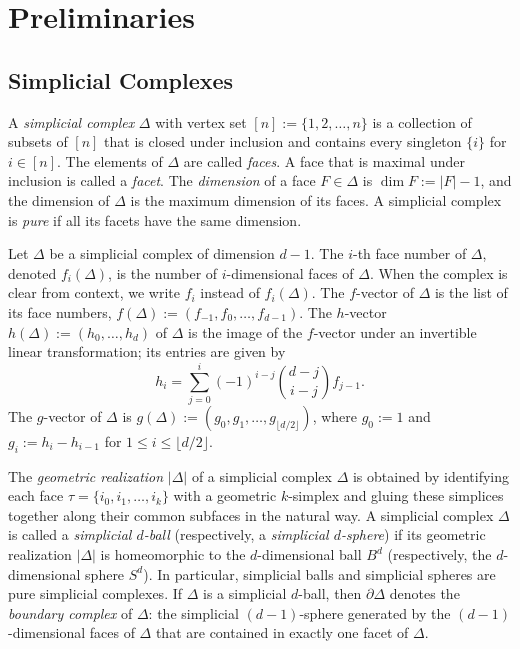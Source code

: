 \documentclass[11pt]{article}
\theoremstyle{definition}
\numberwithin{equation}{theorem}
\begin{document}
\section{Preliminaries}\label{sec:prelim}


\subsection{Simplicial Complexes}

A \emph{simplicial complex} $\Delta$ with vertex set $[n]:=\{1,2,\dots,n\}$ is a collection of subsets of $[n]$ that is closed under inclusion and contains every singleton $\{i\}$ for $i \in [n]$. The elements of $\Delta$ are called \emph{faces}. A face that is maximal under inclusion is called a \emph{facet}. The \emph{dimension} of a face $F \in \Delta$ is $\dim F := |F|-1$, and the dimension of $\Delta$ is the maximum dimension of its faces. A simplicial complex is \emph{pure} if all its facets have the same dimension.

Let $\Delta$ be a simplicial complex of dimension $d-1$. The $i$-th face number of $\Delta$, denoted $f_i(\Delta)$, is the number of $i$-dimensional faces of $\Delta$. When the complex is clear from context, we write $f_i$ instead of $f_i(\Delta)$. The $f$-vector of $\Delta$ is the list of its face numbers, $f(\Delta) := (f_{-1}, f_0, \ldots, f_{d-1})$. The $h$-vector $h(\Delta) := (h_0,\ldots,h_d)$ of $\Delta$ is the image of the $f$-vector under an invertible linear transformation; its entries are given by
$$h_i = \sum_{j=0}^i (-1)^{i-j}\binom{d-j}{i-j}f_{j-1}.$$
The $g$-vector of $\Delta$ is $g(\Delta) := (g_0, g_1, \ldots, g_{\lfloor d/2\rfloor})$, where $g_0 := 1$ and $g_i := h_i-h_{i-1}$ for $1\leq i \leq \lfloor d/2\rfloor$.


The \emph{geometric realization} $|\Delta|$ of a simplicial complex $\Delta$ is obtained by identifying each face $\tau = \{i_0, i_1, \ldots, i_k\}$ with a geometric $k$-simplex and gluing these simplices together along their common subfaces in the natural way. A simplicial complex $\Delta$ is called a \emph{simplicial $d$-ball} (respectively, a \emph{simplicial $d$-sphere}) if its geometric realization $|\Delta|$ is homeomorphic to the $d$-dimensional ball $B^d$ (respectively, the $d$-dimensional sphere $S^d$). In particular, simplicial balls and simplicial spheres are pure simplicial complexes. If $\Delta$ is a simplicial $d$-ball, then $\partial\Delta$ denotes the \emph{boundary complex} of $\Delta$: the simplicial $(d-1)$-sphere generated by the $(d-1)$-dimensional faces of $\Delta$ that are contained in exactly one facet of $\Delta$.
\end{document}
